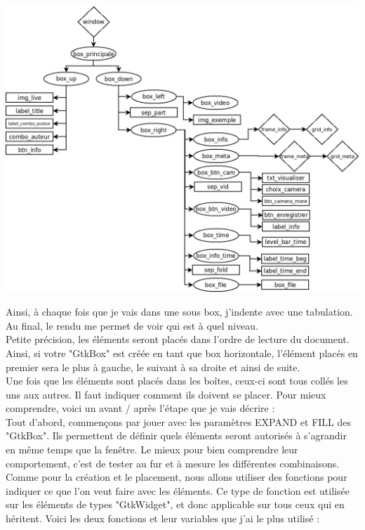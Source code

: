 \documentclass[11pt,french,a4paper]{report}
\begin{document}
\begin{center}
\includegraphics[scale=0.5]{../images/dia/diagramme_fenetre.png} \\
\end{center}

Ainsi, à chaque fois que je vais dans une sous box, j'indente avec une tabulation. Au final, le rendu me permet de voir qui est
à quel niveau. \\
Petite précision, les éléments seront placés dans l'ordre de lecture du document. Ainsi, si votre "GtkBox" est créée en tant
que box horizontale, l'élément placés en premier sera le plus à gauche, le suivant à sa droite et ainsi de suite. \\ 


Une fois que les éléments sont placés dans les boîtes, ceux-ci sont tous collés les uns aux autres. Il faut indiquer 
comment ils doivent se placer. Pour mieux comprendre, voici un avant / après l'étape que je vais décrire : \\ 


Tout d'abord, commençons par jouer avec les paramètres EXPAND et FILL des "GtkBox". Ils permettent de définir quels éléments seront 
autorisés à s'agrandir en même temps que la fenêtre. Le mieux pour bien comprendre leur comportement, c'est de tester au fur
et à mesure les différentes combinaisons. \\

Comme pour la création et le placement, nous allons utiliser des fonctions pour indiquer ce que l'on veut faire avec les éléments.
Ce type de fonction est utilisée sur les éléments de types "GtkWidget", et donc applicable sur tous ceux qui en héritent. Voici les
deux fonctions et leur variables que j'ai le plus utilisé : \\
\end{document}
